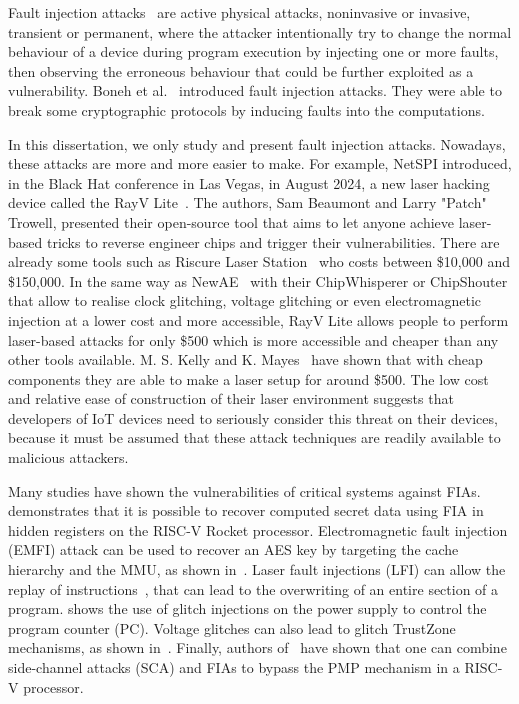 Fault injection attacks~\cite{BCNTW-06-procieee, BBKN-12-procieee, YSW-18-hss} are active physical attacks, noninvasive or invasive, transient or permanent, where the attacker intentionally try to change the normal behaviour of a device during program execution by injecting one or more faults, then observing the erroneous behaviour that could be further exploited as a vulnerability. Boneh et al.~\cite{BDL-97-eurocrypt} introduced fault injection attacks. They were able to break some cryptographic protocols by inducing faults into the computations.

In this dissertation, we only study and present fault injection attacks. Nowadays, these attacks are more and more easier to make. For example, NetSPI introduced, in the Black Hat conference in Las Vegas, in August 2024, a new laser hacking device called the RayV Lite~\cite{rayvlite_wired}. The authors, Sam Beaumont and Larry "Patch" Trowell, presented their open-source tool that aims to let anyone achieve laser-based tricks to reverse engineer chips and trigger their vulnerabilities. There are already some tools such as Riscure Laser Station~\cite{riscure_station} who costs between \$10,000 and \$150,000. In the same way as NewAE~\cite{chipwhisperer} with their ChipWhisperer or ChipShouter that allow to realise clock glitching, voltage glitching or even electromagnetic injection at a lower cost and more accessible, RayV Lite allows people to perform laser-based attacks for only \$500 which is more accessible and cheaper than any other tools available. M. S. Kelly and K. Mayes~\cite{KM-20-host} have shown that with cheap components they are able to make a laser setup for around \$500. The low cost and relative ease of construction of their laser environment suggests that developers of IoT devices need to seriously consider this threat on their devices, because it must be assumed that these attack techniques are readily available to malicious attackers.

Many studies have shown the vulnerabilities of critical systems against FIAs.
\cite{LBDP-19-date} demonstrates that it is possible to recover computed secret data using FIA in hidden registers on the RISC-V Rocket processor. 
Electromagnetic fault injection (EMFI) attack can be used to recover an AES key by targeting the cache hierarchy and the MMU, as shown in~\cite{TBELB-21-jce}.
Laser fault injections (LFI) can allow the replay of instructions~\cite{KDD-21-dsd}, that can lead to the overwriting of an entire section of a program.
\cite{TSW-16-fdtc} shows the use of glitch injections on the power supply to control the program counter (PC). Voltage glitches can also lead to glitch TrustZone mechanisms, as shown in~\cite{SMS-23-usenix}.
Finally, authors of~\cite{NSUH-21-tches} have shown that one can combine side-channel attacks (SCA) and FIAs to bypass the PMP mechanism in a RISC-V processor.

